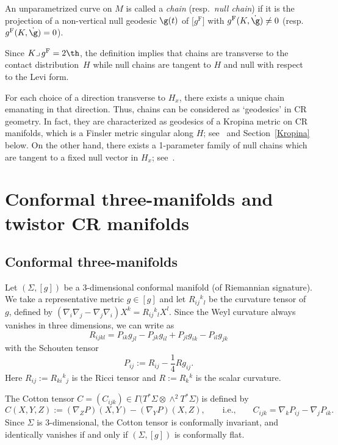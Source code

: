 \begin{Definition}
An unparametrized curve on $M$ is called a {\it chain} (resp.\ {\it null chain}) if it is the projection of a non-vertical null geodesic $\g(t)$ of $\bigl[g^{\mathrm{F}}\bigr]$ with $g^{\mathrm{F}}(K, \dot\g)\neq0$ \big(resp.\ $g^{\mathrm{F}}(K, \dot\g)=0$\big).
\end{Definition}

Since $K\lrcorner\, g^{\mathrm{F}}=2\th$, the definition implies that chains are transverse to the contact distribution~$H$ while null chains are tangent to $H$ and null with respect to the Levi form.

For each choice of a direction transverse to $H_x$, there exists a unique chain emanating in that direction. Thus, chains can be considered as `geodesics' in CR geometry. In fact, they are characterized as geodesics of a Kropina metric on CR manifolds, which is a Finsler metric singular along $H$; see~\cite{CMMM} and Section~\ref{Kropina} below. On the other hand, there exists a 1-parameter family of null chains which are tangent to a fixed null vector in $H_x$; see~\cite{Koch}.

\section{Conformal three-manifolds and twistor CR manifolds}\label{conformal-three}

\subsection{Conformal three-manifolds}
Let $(\Sigma, [g])$ be a $3$-dimensional conformal manifold (of Riemannian signature). We take a representative metric $g\in[g]$ and let $R_{ij}{}^k{}_l$ be the curvature tensor of $g$, defined by $(\nabla_i\nabla_j-\nabla_j\nabla_i)X^k=R_{ij}{}^k{}_lX^l$. Since the Weyl curvature always vanishes in three dimensions, we can write as
\begin{equation}\label{curvature-tensor}
R_{ijkl}=P_{ik}g_{jl}-P_{jk}g_{il}+P_{jl}g_{ik}-P_{il}g_{jk}
\end{equation}
with the Schouten tensor
\[
P_{ij}:=R_{ij}-\frac{1}{4}Rg_{ij}.
\]
Here $R_{ij}:=R_{ki}{}^k{}_j$ is the Ricci tensor and $R:=R_k{}^k$ is the scalar curvature.

The Cotton tensor $C=(C_{ijk})\in \Gamma\bigl(T^*\Sigma\otimes \wedge^2 T^*\Sigma\bigr)$ is defined by
\[
C(X, Y, Z):=(\nabla_Z P)(X, Y)-(\nabla_Y P)(X, Z), \qquad \text{i.e.,}\qquad
C_{ijk}=\nabla_k P_{ij}-\nabla_j P_{ik}.
\]
Since $\Sigma$ is 3-dimensional, the Cotton tensor is conformally invariant, and identically vanishes if and only if $(\Sigma, [g])$ is conformally flat.

